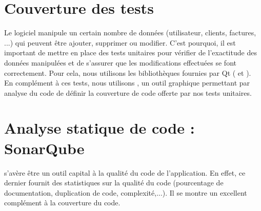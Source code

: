 \section{Couverture des tests}
Le logiciel \FactDev manipule un certain nombre de données (utilisateur, clients, factures, ...) qui peuvent être ajouter, supprimer ou modifier. C'est pourquoi, il est important de mettre en place des tests unitaires pour vérifier de l'exactitude des données manipulées et de s'assurer que les modifications effectuées se font correctement. Pour cela, nous utilisons les bibliothèques fournies par Qt ( et ). \\
En complément à ces tests, nous utilisons , un outil graphique permettant par analyse du code de définir la couverture de code offerte par nos tests unitaires. 
\section{Analyse statique de code : SonarQube}
 s'avère être un outil capital à la qualité du code de l'application. En effet, ce dernier fournit des statistiques sur la qualité du code (pourcentage de documentation, duplication de code, complexité,...). Il se montre un excellent complément à la couverture du code.  